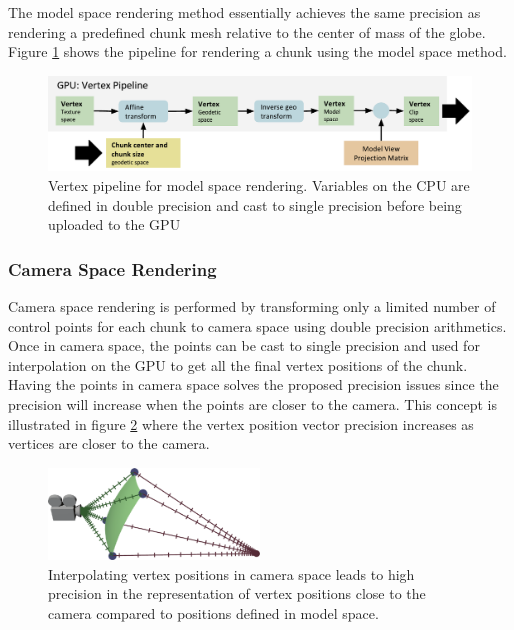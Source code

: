 The model space rendering method essentially achieves the same precision as rendering a predefined chunk mesh relative to the center of mass of the globe. Figure \ref{fig:pipelineglobal} shows the pipeline for rendering a chunk using the model space method.

\begin{figure}[htbp]
    \centering
    \includegraphics[width=\textwidth]{figures/implementation/rendering/pipeline_global.pdf}
    \caption{Vertex pipeline for model space rendering. Variables on the CPU are defined in double precision and cast to single precision before being uploaded to the GPU}
    \label{fig:pipelineglobal}
\end{figure}

\subsubsection{Camera Space Rendering}

Camera space rendering is performed by transforming only a limited number of control points for each chunk to camera space using double precision arithmetics. Once in camera space, the points can be cast to single precision and used for interpolation on the GPU to get all the final vertex positions of the chunk. Having the points in camera space solves the proposed precision issues since the precision will increase when the points are closer to the camera. This concept is illustrated in figure \ref{fig:local} where the vertex position vector precision increases as vertices are closer to the camera.

\begin{figure}[htbp]
    \centering
    \includegraphics[width=0.5\textwidth]{figures/implementation/rendering/local.pdf}
    \caption{Interpolating vertex positions in camera space leads to high precision in the representation of vertex positions close to the camera compared to positions defined in model space.}
    \label{fig:local}
\end{figure}

